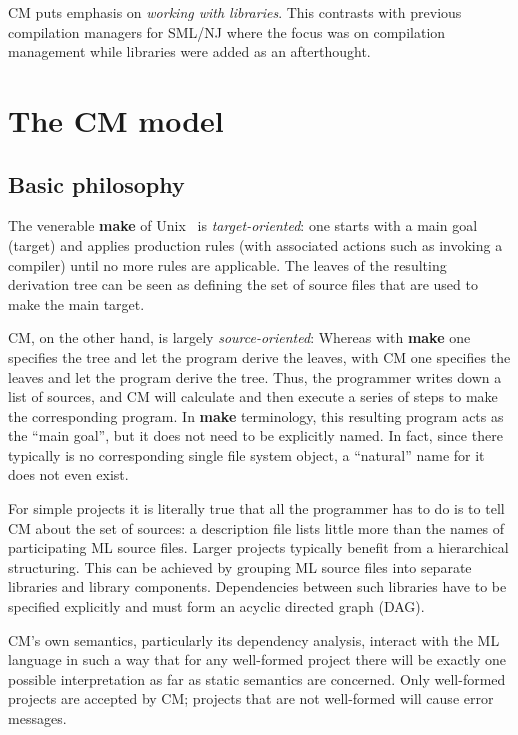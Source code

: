 \documentclass[titlepage,letterpaper]{article}
\begin{document}
CM puts emphasis on {\em working with libraries}.  This contrasts with
previous compilation managers for SML/NJ where the focus was on
compilation management while libraries were added as an afterthought.

\section{The CM model}

\subsection{Basic philosophy}

The venerable {\bf make} of Unix~\cite{feldman79} is {\em
target-oriented}: one starts with a main goal (target) and applies
production rules (with associated actions such as invoking a compiler)
until no more rules are applicable. The leaves of the resulting
derivation tree can be seen as defining the set of source files that
are used to make the main target.

CM, on the other hand, is largely {\em source-oriented}: Whereas with
{\bf make} one specifies the tree and let the program derive the
leaves, with CM one specifies the leaves and let the program derive
the tree.  Thus, the programmer writes down a list of sources, and CM
will calculate and then execute a series of steps to make the
corresponding program.  In {\bf make} terminology, this resulting
program acts as the ``main goal'', but it does not need to be
explicitly named.  In fact, since there typically is no corresponding
single file system object, a ``natural'' name for it does not even
exist.

For simple projects it is literally true that all the programmer has
to do is to tell CM about the set of sources: a description file lists
little more than the names of participating ML source files. Larger
projects typically benefit from a hierarchical structuring.  This can
be achieved by grouping ML source files into separate libraries and
library components.  Dependencies between such libraries have to be
specified explicitly and must form an acyclic directed graph (DAG).

CM's own semantics, particularly its dependency analysis, interact
with the ML language in such a way that for any well-formed project
there will be exactly one possible interpretation as far as static
semantics are concerned.  Only well-formed projects are accepted by
CM; projects that are not well-formed will cause error messages.
\end{document}
